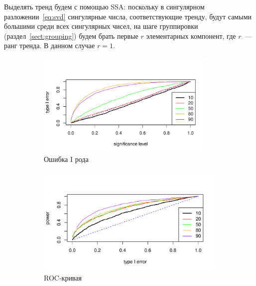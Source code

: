 \documentclass[specialist,
substylefile = spbu_report.rtx,
subf,href,colorlinks=true, 12pt]{disser}
\theoremstyle{definition}
\begin{document}
Выделять тренд будем с помощью SSA: поскольку в сингулярном разложении~\eqref{eq:svd} сингулярные числа, соответствующие тренду, будут самыми большими среди всех сингулярных чисел, на шаге группировки (раздел~\ref{sect:grouping}) будем брать первые $r$ элементарных компонент, где $r$~--- ранг тренда. В данном случае $r=1$.

\begin{figure}[h!]
	\captionsetup[subfigure]{justification=Centering}
	\begin{subfigure}[t]{0.5\textwidth}
		\centering
		\includegraphics[width=0.95\textwidth]{img/type1error_trend.pdf}
		\caption{Ошибка I рода}
		\label{fig:trend_type1error}
	\end{subfigure}\hspace{\fill}
	\begin{subfigure}[t]{0.5\textwidth}
		\centering
		\includegraphics[width=\textwidth]{img/roc_trend.pdf}
		\caption{ROC-кривая}
		\label{fig:trend_roc}
	\end{subfigure}
	\begin{subfigure}[t]{0.5\textwidth}
		\centering

\end{subfigure}
\end{figure}
\end{document}
